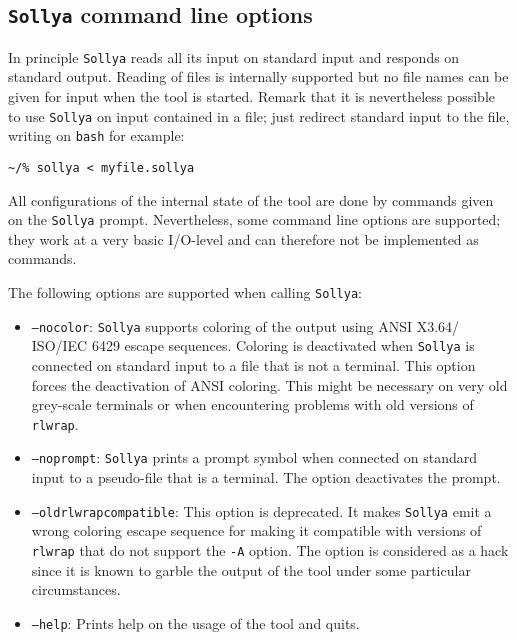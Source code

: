 \documentclass[a4paper]{article}
\newcommand{\sollya}{\texttt{Sollya}\xspace}
\begin{document}
\subsection{\sollya command line options}

In principle \sollya reads all its input on standard input and responds
on standard output. Reading of files is internally supported but no
file names can be given for input when the tool is started. Remark that 
it is nevertheless possible to use \sollya on input contained in a file; 
just redirect standard input to the file, writing on \texttt{bash} for example:
\begin{center}\begin{minipage}{15cm}\begin{Verbatim}[frame=single]
~/% sollya < myfile.sollya 
\end{Verbatim}
\end{minipage}\end{center}

All configurations of the internal state of the tool are done by
commands given on the \sollya prompt. Nevertheless, some command line
options are supported; they work at a very basic I/O-level and can
therefore not be implemented as commands.

The following options are supported when calling \sollya:
\begin{itemize}
\item \texttt{--nocolor}: \sollya supports coloring of the output
  using ANSI X3.64/ ISO/IEC 6429 escape sequences. Coloring is
  deactivated when \sollya is connected on standard input to a file
  that is not a terminal. This option forces the deactivation of ANSI
  coloring. This might be necessary on very old grey-scale terminals or when
  encountering problems with old versions of \texttt{rlwrap}. 
\item \texttt{--noprompt}: \sollya prints a prompt symbol when
  connected on standard input to a pseudo-file that is a terminal. The
  option deactivates the prompt.
\item \texttt{--oldrlwrapcompatible}: This option is deprecated. It
  makes \sollya emit a wrong coloring escape sequence for making it
  compatible with versions of \texttt{rlwrap} that do not support the
  \texttt{-A} option. The option is considered as a hack since it is
  known to garble the output of the tool under some particular
  circumstances.
\item \texttt{--help}: Prints help on the usage of the tool and quits.
\end{itemize}
\end{document}
